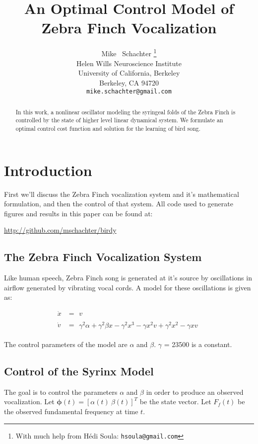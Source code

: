 \documentclass{article} %
\title{An Optimal Control Model of Zebra Finch Vocalization}
\author{
Mike ~Schachter
\thanks{ With much help from H\'{e}di Soula:
\texttt{hsoula@gmail.com}} \\
Helen Wills Neuroscience Institute\\
University of California, Berkeley\\
Berkeley, CA 94720 \\
\texttt{mike.schachter@gmail.com}
}
\begin{document}
\maketitle

\begin{abstract}
In this work, a nonlinear oscillator modeling the syringeal folds of the
Zebra Finch is controlled by the state of higher level linear dynamical system.
We formulate an optimal control cost function and solution for the learning of
bird song.
\end{abstract}

\section{Introduction}

First we'll discuss the Zebra Finch vocalization system and it's mathematical
formulation, and then the control of that system. All code used to generate
figures and results in this paper can be found at:
\begin{center}
   \url{http://github.com/mschachter/birdy}
\end{center}

\subsection{The Zebra Finch Vocalization System}

Like human speech, Zebra Finch song is generated at it's source by oscillations in airflow
generated by vibrating vocal cords. A model for these oscillations is given as:

\begin{align*}
\dot{x}&=\begin{aligned}v\end{aligned} \\
\dot{v}&=\begin{aligned}\gamma^2 \alpha + \gamma^2 \beta x - \gamma^2 x^3 - \gamma x^2 v + \gamma^2 x^2 - \gamma x v\end{aligned}
\end{align*}

The control parameters of the model are $\alpha$ and $\beta$. $\gamma$ = 23500 is a constant.

\subsection{Control of the Syrinx Model}

The goal is to control the parameters $\alpha$ and $\beta$ in order to produce an observed
vocalization. Let $\bm{\phi}(t) = \left[ \alpha(t) ~ \beta(t) \right]^T$ be the state vector. Let
$F_f(t)$ be the observed fundamental frequency at time $t$.
\end{document}
